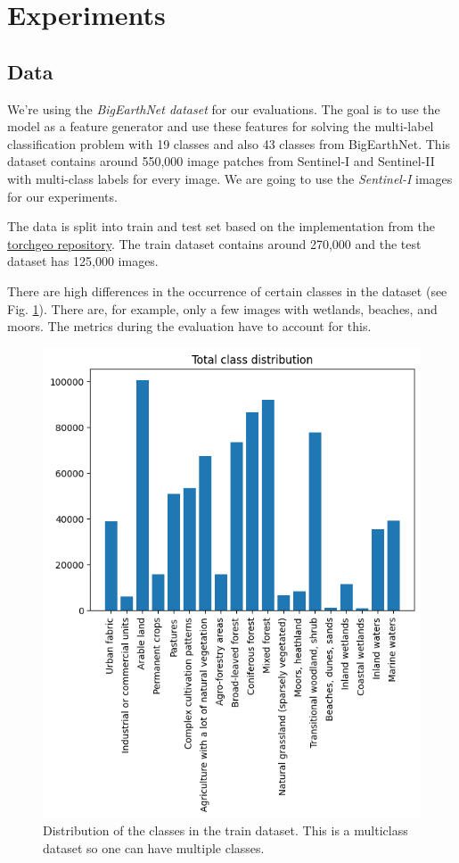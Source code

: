 \section{Experiments}

\subsection{Data}

We're using the \textit{BigEarthNet dataset} \cite{bigearthnet} for our evaluations. The goal is to use the model as a feature generator and use these features for solving the multi-label classification problem with 19 classes and also 43 classes from BigEarthNet. This dataset contains around 550,000 image patches from Sentinel-I and Sentinel-II with multi-class labels for every image. We are going to use the \textit{Sentinel-I} images for our experiments.

The data is split into train and test set based on the implementation from the \href{https://torchgeo.readthedocs.io/en/latest/api/datasets.html#bigearthnet}{torchgeo repository}. The train dataset contains around 270,000 and the test dataset has 125,000 images.

There are high differences in the occurrence of certain classes in the dataset (see Fig. \ref{fig:class-distribution}). There are, for example, only a few images with wetlands, beaches, and moors. The metrics during the evaluation have to account for this.

\begin{figure}[h]
  \centering
  \includegraphics[width=0.8\columnwidth]{images/class_distribution.png}
  \caption{Distribution of the classes in the train dataset. This is a multiclass dataset so one can have multiple classes.}
  \label{fig:class-distribution}
\end{figure}

